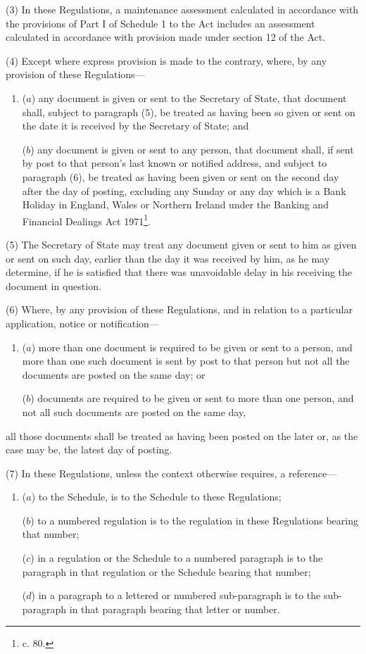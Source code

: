 \documentclass[a4paper]{article}
\begin{document}
(3) In these Regulations, a maintenance assessment calculated in accordance with the provisions of Part I of Schedule 1 to the Act includes an assessment calculated in accordance with provision made under section 12 of the Act.

(4) Except where express provision is made to the contrary, where, by any provision of these Regulations—
\begin{enumerate}\item[]
($a$) any document is given or sent to the Secretary of State, that document shall, subject to paragraph (5), be treated as having been so given or sent on the date it is received by the Secretary of State; and

($b$) any document is given or sent to any person, that document shall, if sent by post to that person’s last known or notified address, and subject to paragraph (6), be treated as having been given or sent on the second day after the day of posting, excluding any Sunday or any day which is a Bank Holiday in England, Wales or Northern Ireland under the Banking and Financial Dealings Act 1971\footnote{ c. 80.}.
\end{enumerate}

(5) The Secretary of State may treat any document given or sent to him as given or sent on such day, earlier than the day it was received by him, as he may determine, if he is satisfied that there was unavoidable delay in his receiving the document in question.

(6) Where, by any provision of these Regulations, and in relation to a particular 
application, notice or notification—
\begin{enumerate}\item[]
($a$) more than one document is required to be given or sent to a person, and more than one such document is sent by post to that person but not all the documents are posted on the same day; or

($b$) documents are required to be given or sent to more than one person, and not all such documents are posted on the same day,
\end{enumerate}
all those documents shall be treated as having been posted on the later or, as the case may be, the latest day of posting.

(7) In these Regulations, unless the context otherwise requires, a reference—
\begin{enumerate}\item[]
($a$) to the Schedule, is to the Schedule to these Regulations;

($b$) to a numbered regulation is to the regulation in these Regulations bearing that number;

($c$) in a regulation or the Schedule to a numbered paragraph is to the paragraph in that regulation or the Schedule bearing that number;

($d$) in a paragraph to a lettered or numbered sub-paragraph is to the sub-paragraph in that paragraph bearing that letter or number.
\end{enumerate}
\end{document}
